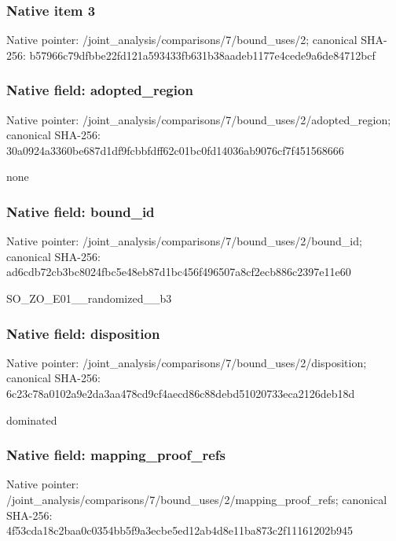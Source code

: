 \documentclass[10pt,a4paper]{article}
\begin{document}
\subsubsection{Native item 3}
Native pointer: /joint\_\allowbreak{}analysis/comparisons/7/bound\_\allowbreak{}uses/2; canonical SHA-256: b57966c79dfbbe22fd121a593433fb631b38aadeb1177e4cede9a6de84712bcf

\subsubsection{Native field: adopted\_\allowbreak{}region}
Native pointer: /joint\_\allowbreak{}analysis/comparisons/7/bound\_\allowbreak{}uses/2/adopted\_\allowbreak{}region; canonical SHA-256: 30a0924a3360be687d1df9fcbbfdff62c01bc0fd14036ab9076cf7f451568666

\begingroup\raggedright\sloppy none\par\endgroup

\subsubsection{Native field: bound\_\allowbreak{}id}
Native pointer: /joint\_\allowbreak{}analysis/comparisons/7/bound\_\allowbreak{}uses/2/bound\_\allowbreak{}id; canonical SHA-256: ad6cdb72cb3bc8024fbc5e48eb87d1bc456f496507a8cf2ecb886c2397e11e60

\begingroup\raggedright\sloppy SO\_\allowbreak{}ZO\_\allowbreak{}E01\_\allowbreak{}\_\allowbreak{}randomized\_\allowbreak{}\_\allowbreak{}b3\par\endgroup

\subsubsection{Native field: disposition}
Native pointer: /joint\_\allowbreak{}analysis/comparisons/7/bound\_\allowbreak{}uses/2/disposition; canonical SHA-256: 6c23c78a0102a9e2da3aa478cd9cf4aecd86c88debd51020733eca2126deb18d

\begingroup\raggedright\sloppy dominated\par\endgroup

\subsubsection{Native field: mapping\_\allowbreak{}proof\_\allowbreak{}refs}
Native pointer: /joint\_\allowbreak{}analysis/comparisons/7/bound\_\allowbreak{}uses/2/mapping\_\allowbreak{}proof\_\allowbreak{}refs; canonical SHA-256: 4f53cda18c2baa0c0354bb5f9a3ecbe5ed12ab4d8e11ba873c2f11161202b945
\end{document}
